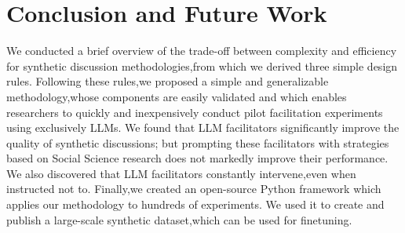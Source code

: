 %
\section{Conclusion and Future Work}

We conducted a brief overview of the trade-off between complexity and efficiency for synthetic discussion methodologies,from which we derived three simple design rules. Following these rules,we proposed a simple and generalizable methodology,whose components are easily validated and which enables researchers to quickly and inexpensively conduct pilot facilitation experiments using exclusively LLMs. We found that LLM facilitators significantly improve the quality of synthetic discussions; but prompting these facilitators with strategies based on Social Science research does not markedly improve their performance. We also discovered that LLM facilitators constantly intervene,even when instructed not to. Finally,we created an open-source Python framework which applies our methodology to hundreds of experiments. We used it to create and publish a large-scale synthetic dataset,which can be used for finetuning.